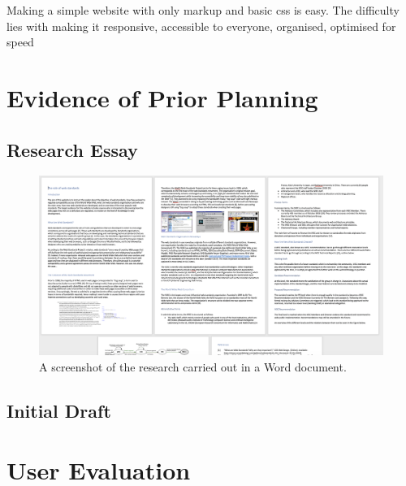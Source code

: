 \documentclass[letterpaper,12pt]{article}
\begin{document}
Making a simple website with only markup and basic css is easy. The difficulty lies with making it responsive, accessible to everyone, organised, optimised for speed


\begin{appendices}

\newpage



\clearpage
\section{Evidence of Prior Planning}

\subsection{Research Essay}
\label{sec:appendix-prior-planning-research-essay}

\begin{figure}[h] 
\centerline{\includegraphics[width=1.1\textwidth]{report/images/prior-planning-research.png}}
\caption{\label{fig:prior-planning-research}A screenshot of the research carried out in a Word document.}
\end{figure}

\subsection{Initial Draft}
\label{sec:appendix-prior-initial-draft}



\clearpage
\section{User Evaluation}


\end{appendices}
\end{document}
